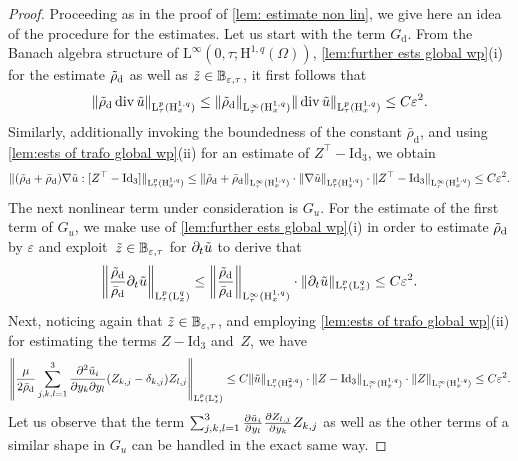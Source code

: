 \documentclass[10pt]{amsart}
\theoremstyle{plain}
\theoremstyle{definition}
\theoremstyle{thm}
\numberwithin{equation}{section}
\newcommand{\rL}{\mathrm{L}}
\newcommand{\rLp}{\rL^p}
\newcommand{\rH}{\mathrm{H}}
\DeclareMathOperator{\mdiv}{div}
\newcommand{\del}{\partial}
\newcommand{\dt}{\del_t}
\newcommand{\eps}{\varepsilon}
\newcommand{\rd}{\mathrm{d}}
\newcommand{\trho}{\Tilde{\rho}}
\newcommand{\tu}{\Tilde{u}}
\newcommand{\tz}{\Tilde{z}}
\begin{document}
\begin{proof}
Proceeding as in the proof of \autoref{lem: estimate non lin}, we give here an idea of the procedure for the estimates. 
Let us start with the term $G_{\rd}$.  
From the Banach algebra structure of $\rL^\infty(0,\tau;\rH^{1,q}(\Omega))$, \autoref{lem:further ests global wp}(i) for the estimate $\trho_{\rd}$ as well as $\tz \in \mathbb{B_{\eps,\tau}}$, it first follows that 
\begin{equation*}
    \|\trho_\rd \mdiv\tu\|_{\rLp_{\tau}(\rH^{1,q}_x)}\leq \|\trho_{\rd}\|_{\rL^\infty_\tau (\rH^{1,q}_x)}\|\mdiv\tu\|_{\rL^p_\tau(\rH^{1,q}_x)}\leq C\eps^{2}.
\end{equation*}
Similarly, additionally invoking the boundedness of the constant $\bar{\rho}_\rd$, and using \autoref{lem:ests of trafo global wp}(ii) for an estimate of $Z^\top- \mathrm{Id}_3$, we obtain
\begin{equation*}
    \begin{aligned}
        \|(\trho_{\rd}+\bar{\rho}_\rd)\nabla\tu:[Z^\top-\mathrm{Id}_3]\|_{\rL^p_\tau(\rH^{1,q}_x)}
        \leq \|\trho_{\rd}+\bar{\rho}_\rd\|_{\rL^\infty_\tau(\rH^{1,q}_x)} \cdot \|\nabla\tu\|_{\rL^p_\tau(\rH^{1,q}_x)} \cdot \|Z^\top-\mathrm{Id}_3\|_{\rL^\infty_\tau(\rH^{1,q}_x)}\leq C\eps^{2}.
    \end{aligned}
\end{equation*}
The next nonlinear term under consideration is $G_u$. 
For the estimate of the first term of $G_u$, we make use of \autoref{lem:further ests global wp}(i) in order to estimate $\trho_{\rd}$ by $\eps$ and exploit~$\tz \in \mathbb{B_{\eps,\tau}}$ for $\dt \tu$ to derive that
\begin{equation*}
   \left\|\frac{\trho_\rd}{\bar{\rho}_\rd}\del_t\tu\right\|_{\rL^p_\tau(\rL^{q}_x)}\leq \left\|\frac{\trho_{\rd}}{\bar{\rho}_\rd}\right\|_{\rL^\infty_\tau(\rH^{1,q}_x)} \cdot \|\partial_t\tu\|_{\rL^p_\tau(\rL^{q}_x)}\leq C\eps^2.
\end{equation*}
Next, noticing again that $\tz \in \mathbb{B_{\eps,\tau}}$, and employing \autoref{lem:ests of trafo global wp}(ii) for estimating the terms $Z- \mathrm{Id}_3$ and~$Z$, we have 
\begin{equation*}
    \begin{aligned}
        \left\| \frac{\mu}{ 2\bar{\rho}_\rd}\sum_{j,k,l=1}^3\frac{\partial^{2}\tu_{i}}{\partial{y_{k}}\partial{y_{l}}}(Z_{k,j}-\delta_{k,j})Z_{l,j}  \right\|_{\rL_\tau^{p}(\rL^{q}_x)}
        \leq C \|\tu\|_{\rL^p_\tau(\rH^{2,q}_x)}\cdot\|Z-\mathrm{Id}_3\|_{\rL^{\infty}_\tau(\rH_x^{1,q})} \cdot \|Z\|_{\rL^{\infty}_\tau (\rH_x^{1,q})}\leq C\eps^2.
    \end{aligned}
\end{equation*}
Let us observe that the term $\sum_{j,k,l=1}^3\frac{\partial\tu_{i}}{\partial{y_{l}}} \frac{\partial Z_{l,j}}{\partial{y_{k}}}Z_{k,j}
$ as well as the other terms of a similar shape in $G_u$ can be handled in the exact same way.


\end{proof}
\end{document}
